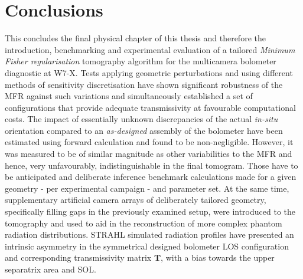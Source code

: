     \section{Conclusions}\label{sec:conclusionschap4}%
%
        This concludes the final physical chapter of this thesis and therefore the introduction, benchmarking and experimental evaluation of a tailored \textit{Minimum Fisher regularisation} tomography algorithm for the multicamera bolometer diagnostic at W7-X. Tests applying geometric perturbations and using different methods of sensitivity discretisation have shown significant robustness of the MFR against such variations and simultaneously established a set of configurations that provide adequate transmissivity at favourable computational costs. The impact of essentially unknown discrepancies of the actual \textit{in-situ} orientation compared to an \textit{as-designed} assembly of the bolometer have been estimated using forward calculation and found to be non-negligible. However, it was measured to be of similar magnitude as other variabilities to the MFR and hence, very unfavourably, indistinguishable in the final tomogram. Those have to be anticipated and deliberate inference benchmark calculations made for a given geometry - per experimental campaign - and parameter set. At the same time, supplementary artificial camera arrays of deliberately tailored geometry, specifically filling gaps in the previously examined setup, were introduced to the tomography and used to aid in the reconstruction of more complex phantom radiation distributions. STRAHL simulated radiation profiles have presented an intrinsic asymmetry in the symmetrical designed bolometer LOS configuration and corresponding transmissivity matrix $\mathbf{T}$, with a bias towards the upper separatrix area and SOL.\\%
